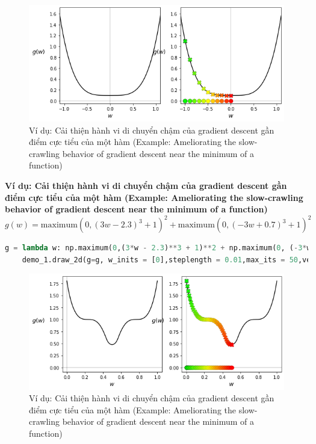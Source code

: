 \documentclass{book}
\begin{document}
\begin{figure}[H]
    \centering
    \includegraphics[width=\textwidth]{images/static_plot_each_step.png}
    \caption{Ví dụ: Cải thiện hành vi di chuyển chậm của gradient descent gần điểm cực tiểu của một hàm (Example: Ameliorating the slow-crawling behavior of gradient descent near the minimum of a function)}
\end{figure}
\textbf{Ví dụ: Cải thiện hành vi di chuyển chậm của gradient descent gần điểm cực tiểu của một hàm (Example: Ameliorating the slow-crawling behavior of gradient descent near the minimum of a function)}
\begin{equation*}
    g(w) = \text{maximum}(0,(3w - 2.3)^3 + 1)^2 + \text{maximum}(0,(-3w + 0.7)^3 + 1)^2
\end{equation*}
\begin{lstlisting}[language=Python, caption={Đoạn mã Python minh họa Gradient Descent đã chuẩn hóa (normalized Gradient Descent) cho hàm mục tiêu phức tạp.}, label={code:matplotlib_plot_norm_2}]
    g = lambda w: np.maximum(0,(3*w - 2.3)**3 + 1)**2 + np.maximum(0, (-3*w + 0.7)**3 + 1)**2
    demo_1.draw_2d(g=g, w_inits = [0],steplength = 0.01,max_its = 50,version = 'normalized',wmin = 0,wmax = 1.0)
\end{lstlisting}
\begin{figure}[H]
    \centering
    \includegraphics[width=\textwidth]{images/static_plot_each_step_2.png}
    \caption{Ví dụ: Cải thiện hành vi di chuyển chậm của gradient descent gần điểm cực tiểu của một hàm (Example: Ameliorating the slow-crawling behavior of gradient descent near the minimum of a function)}
\end{figure}
\end{document}
